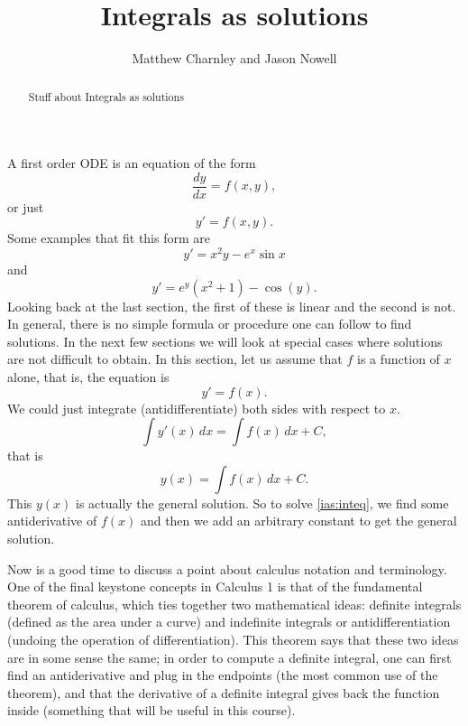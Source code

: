 \documentclass{ximera}
\title{Integrals as solutions}
\author{Matthew Charnley and Jason Nowell}
\begin{document}
\begin{abstract}
    Stuff about Integrals as solutions
\end{abstract}
\maketitle


\label{integralsols:section}




A first order ODE is an equation of the form
\begin{equation*}
    \frac{dy}{dx} = f(x,y) ,
\end{equation*}
or just
\begin{equation*}
    y' = f(x,y) .
\end{equation*} 
Some examples that fit this form are
\[ 
    y' = x^2y - e^x \sin{x} 
\] 
and
\[ 
    y' = e^y(x^2 + 1) - \cos(y). 
\] 
Looking back at the last section, the first of these is linear and the second is not.  In general, there is no simple formula or procedure one can follow to find solutions. In the next few sections we will look at special cases where solutions are not difficult to obtain. In this section, let us assume that $f$ is a function of $x$ alone, that is, the equation is
\begin{equation} \label{ias:inteq}
    y' = f(x) .
\end{equation}
We could just integrate (antidifferentiate) both sides with respect to $x$.
\begin{equation*}
    \int y'(x) \,dx = \int f(x) \,dx + C ,
\end{equation*}
that is
\begin{equation*}
    y(x) = \int f(x) \,dx + C .
\end{equation*}
This $y(x)$ is actually the general solution. So to solve \eqref{ias:inteq}, we find some antiderivative of $f(x)$ and then we add an arbitrary constant to get the general solution.

\medskip

Now is a good time to discuss a point about calculus notation and terminology.  One of the final keystone concepts in Calculus 1 is that of the fundamental theorem of calculus, which ties together two mathematical ideas: definite integrals (defined as the area under a curve) and indefinite integrals or antidifferentiation (undoing the operation of differentiation). This theorem says that these two ideas are in some sense the same; in order to compute a definite integral, one can first find an antiderivative and plug in the endpoints (the most common use of the theorem), and that the derivative of a definite integral gives back the function inside (something that will be useful in this course).
\end{document}
